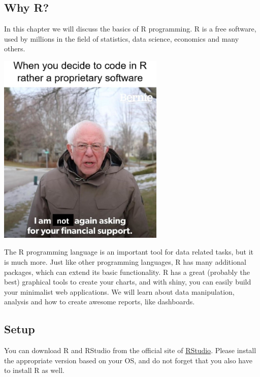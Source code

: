 \documentclass[
]{article}
\begin{document}
\hypertarget{why-r}{%
\subsection{Why R?}\label{why-r}}

In this chapter we will discuss the basics of R programming.
R is a free software, used by millions in the field of statistics, data science, economics and many others.

\href{https://www.facebook.com/Rmemes0/photos/a.1230204967031792/2971372822914989/}{\includegraphics[width=3.125in,height=\textheight]{images/meme_free.jpg}}

The R programming language is an important tool for data related tasks, but it is much more.
Just like other programming languages, R has many additional packages, which can extend its basic functionality.
R has a great (probably the best) graphical tools to create your charts, and with shiny, you can easily build your minimalist web applications.
We will learn about data manipulation, analysis and how to create awesome reports, like dashboards.

\hypertarget{layout}{%
\subsection{Setup}\label{layout}}

You can download R and RStudio from the official site of \href{https://www.rstudio.com/products/rstudio/download/\#download}{RStudio}.
Please install the appropriate version based on your OS, and do not forget that you also have to install R as well.
\end{document}
